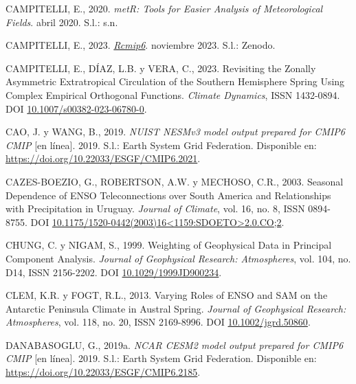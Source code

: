 \documentclass[12pt,oneside,a4paper]{reedthesis}
\newlength{\cslhangindent}
\newenvironment{CSLReferences}[2] %
 {%
  \setlength{\parindent}{0pt}
  \ifodd #1 \everypar{\setlength{\hangindent}{\cslhangindent}}\ignorespaces\fi
  \ifnum #2 > 0
  \setlength{\parskip}{#2\baselineskip}
  \fi
 }%
 {}
\begin{document}
\begin{CSLReferences}{1}{0}
\leavevmode{}%
CAMPITELLI, E., 2020. \emph{{metR}: {Tools} for {Easier Analysis} of {Meteorological Fields}}. abril 2020. S.l.: s.n.

\leavevmode{}%
CAMPITELLI, E., 2023. \emph{\href{https://doi.org/10.5281/zenodo.10138834}{Rcmip6}}. noviembre 2023. S.l.: Zenodo.

\leavevmode{}%
CAMPITELLI, E., DÍAZ, L.B. y VERA, C., 2023. Revisiting the Zonally Asymmetric Extratropical Circulation of the {Southern Hemisphere} Spring Using Complex Empirical Orthogonal Functions. \emph{Climate Dynamics}, ISSN 1432-0894. DOI \href{https://doi.org/10.1007/s00382-023-06780-0}{10.1007/s00382-023-06780-0}.

\leavevmode{}%
CAO, J. y WANG, B., 2019. \emph{NUIST NESMv3 model output prepared for CMIP6 CMIP} {[}en línea{]}. 2019. S.l.: Earth System Grid Federation. Disponible en: \url{https://doi.org/10.22033/ESGF/CMIP6.2021}.

\leavevmode{}%
CAZES-BOEZIO, G., ROBERTSON, A.W. y MECHOSO, C.R., 2003. Seasonal {Dependence} of {ENSO Teleconnections} over {South America} and {Relationships} with {Precipitation} in {Uruguay}. \emph{Journal of Climate}, vol. 16, no. 8, ISSN 0894-8755. DOI \href{https://doi.org/10.1175/1520-0442(2003)16\%3C1159:SDOETO\%3E2.0.CO;2}{10.1175/1520-0442(2003)16\textless1159:SDOETO\textgreater2.0.CO;2}.

\leavevmode{}%
CHUNG, C. y NIGAM, S., 1999. Weighting of Geophysical Data in {Principal Component Analysis}. \emph{Journal of Geophysical Research: Atmospheres}, vol. 104, no. D14, ISSN 2156-2202. DOI \href{https://doi.org/10.1029/1999JD900234}{10.1029/1999JD900234}.

\leavevmode{}%
CLEM, K.R. y FOGT, R.L., 2013. Varying Roles of {ENSO} and {SAM} on the {Antarctic Peninsula} Climate in Austral Spring. \emph{Journal of Geophysical Research: Atmospheres}, vol. 118, no. 20, ISSN 2169-8996. DOI \href{https://doi.org/10.1002/jgrd.50860}{10.1002/jgrd.50860}.

\leavevmode{}%
DANABASOGLU, G., 2019a. \emph{NCAR CESM2 model output prepared for CMIP6 CMIP} {[}en línea{]}. 2019. S.l.: Earth System Grid Federation. Disponible en: \url{https://doi.org/10.22033/ESGF/CMIP6.2185}.


\end{CSLReferences}
\end{document}
